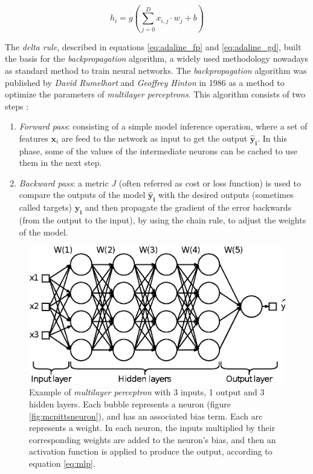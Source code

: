  \begin{equation}
 \label{eq:mlp}
 h_i = g\left(\sum_{j=0}^{D} x_{i,j} \cdot w_{j} + b\right)
 \end{equation}

 The \textit{delta rule}, described in equations \ref{eq:adaline_fp} and \ref{eq:adaline_gd}, built the basis for the \textit{backpropagation} algorithm, a widely used methodology nowadays as standard method to train neural networks. The \textit{backpropagation} algorithm \autocite{hinton1986} was published by \textit{David Rumelhart} and \textit{Geoffrey Hinton} in 1986 as a method to optimize the parameters of \textit{multilayer perceptrons}. This algorithm consists of two steps \autocite{haykin1998}:

\begin{enumerate}
\item \textit{Forward pass}: consisting of a simple model inference operation, where a set of features $\mathbf{x}_i$ are feed to the network as input to get the output $\mathbf{\hat{y}_i}$. In this phase, some of the values of the intermediate neurons can be cached to use them in the next step.

\item \textit{Backward pass}: a metric $J$ (often referred as cost or loss function) is used to compare the outputs of the model $\mathbf{\hat{y}_i}$ with the desired outputs (sometimes called targets) $\mathbf{y_i}$ and then propagate the gradient of the error backwards (from the output to the input), by using the chain rule, to adjust the weights of the model.
\end{enumerate}


\begin{figure}
	\centering
	\includegraphics[width=0.8\linewidth]{background/images/mlp}
	\caption[Multilayer perceptron]{Example of \textit{multilayer perceptron} with 3 inputs, 1 output and 3 hidden layers. Each bubble represents a neuron (figure \ref{fig:mcpittsneuron}), and has an associated bias term. Each arc represents a weight. In each neuron, the inputs multiplied by their corresponding weights are added to the neuron's bias, and then an activation function is applied to produce the output, according to equation \ref{eq:mlp}.}
	\label{fig:mlp}
\end{figure}


